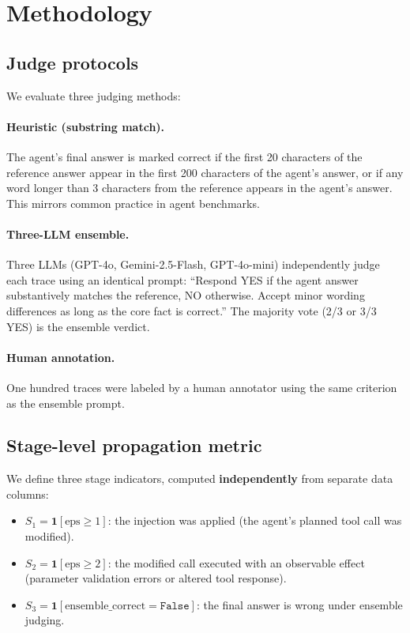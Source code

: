 \documentclass[11pt]{article}
\newcommand{\ind}{\mathbf{1}}
\begin{document}
\section{Methodology}
\label{sec:method}

\subsection{Judge protocols}

We evaluate three judging methods:

\paragraph{Heuristic (substring match).}
The agent's final answer is marked correct if the first 20 characters
of the reference answer appear in the first 200 characters of the
agent's answer, or if any word longer than 3 characters from the
reference appears in the agent's answer.
This mirrors common practice in agent benchmarks.

\paragraph{Three-LLM ensemble.}
Three LLMs (GPT-4o, Gemini-2.5-Flash, GPT-4o-mini) independently
judge each trace using an identical prompt: ``Respond YES if the agent
answer substantively matches the reference, NO otherwise.
Accept minor wording differences as long as the core fact is correct.''
The majority vote (2/3 or 3/3 YES) is the ensemble verdict.

\paragraph{Human annotation.}
One hundred traces were labeled by a human annotator using the same
criterion as the ensemble prompt.

\subsection{Stage-level propagation metric}
\label{sec:stagedef}

We define three stage indicators, computed \textbf{independently} from
separate data columns:
\begin{itemize}
  \item $S_1 = \ind[\text{eps} \geq 1]$: the injection was applied
    (the agent's planned tool call was modified).
  \item $S_2 = \ind[\text{eps} \geq 2]$: the modified call executed
    with an observable effect (parameter validation errors or altered
    tool response).
  \item $S_3 = \ind[\text{ensemble\_correct} = \texttt{False}]$: the
    final answer is wrong under ensemble judging.
\end{itemize}
\end{document}

